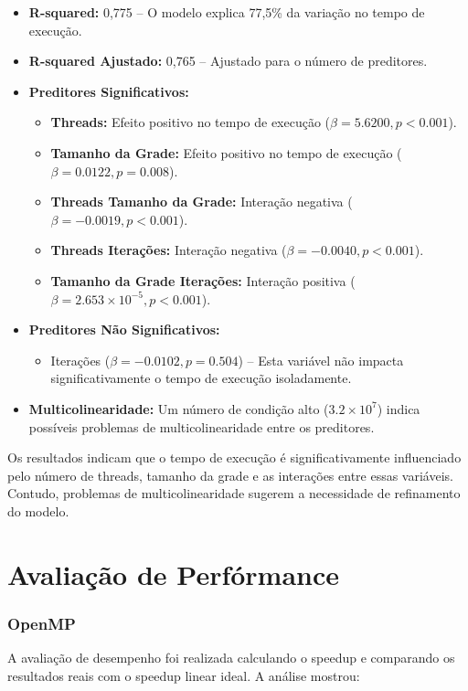 \begin{itemize}
    \item \textbf{R-squared:} 0,775 – O modelo explica 77,5\% da variação no tempo de execução.
    \item \textbf{R-squared Ajustado:} 0,765 – Ajustado para o número de preditores.
    \item \textbf{Preditores Significativos:}
          \begin{itemize}
              \item \textbf{Threads:} Efeito positivo no tempo de execução (\( \beta = 5.6200, p < 0.001 \)).
              \item \textbf{Tamanho da Grade:} Efeito positivo no tempo de execução (\( \beta = 0.0122, p = 0.008 \)).
              \item \textbf{Threads \texttimes Tamanho da Grade:} Interação negativa (\( \beta = -0.0019, p < 0.001 \)).
              \item \textbf{Threads \texttimes Iterações:} Interação negativa (\( \beta = -0.0040, p < 0.001 \)).
              \item \textbf{Tamanho da Grade \texttimes Iterações:} Interação positiva (\( \beta = 2.653 \times 10^{-5}, p < 0.001 \)).
          \end{itemize}
    \item \textbf{Preditores Não Significativos:}
          \begin{itemize}
              \item Iterações (\( \beta = -0.0102, p = 0.504 \)) – Esta variável não impacta significativamente o tempo de execução isoladamente.
          \end{itemize}
    \item \textbf{Multicolinearidade:} Um número de condição alto (\( 3.2 \times 10^7 \)) indica possíveis problemas de multicolinearidade entre os preditores.
\end{itemize}

Os resultados indicam que o tempo de execução é significativamente influenciado pelo número de threads, tamanho da grade e as interações entre essas variáveis. Contudo, problemas de multicolinearidade sugerem a necessidade de refinamento do modelo.

\section{Avaliação de Perfórmance}\label{sec:evaluation}
\subsubsection{OpenMP}
A avaliação de desempenho foi realizada calculando o speedup e comparando os resultados reais com o speedup linear ideal. A análise mostrou:

